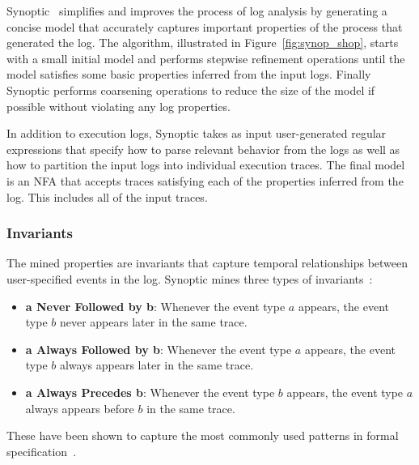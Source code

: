 \footnotetext[\value{footnote}]{The user with IP address 13.15.232.201 reduces 
   the shopping cart price despite applying an invalid coupon.}

Synoptic~\cite{BeschastnikhBSSE2011} simplifies and improves the process of log
analysis 
by generating a concise model that accurately captures important properties of the
process that generated the log. The algorithm, illustrated in
Figure~\ref{fig:synop_shop}, starts with a small initial model and
performs stepwise refinement operations until the model satisfies some basic
properties inferred from the input logs. Finally Synoptic performs coarsening
operations to reduce the size of the model if possible without violating any log
properties.

In addition to execution logs, Synoptic takes as
input user-generated regular expressions that specify how to parse relevant 
behavior from the logs
as well as how to partition the input logs into individual
execution traces. The final model is an NFA that accepts
traces satisfying each of the properties inferred from the log. This includes
all of the input traces.

\subsubsection{Invariants}
The mined properties are invariants that capture temporal relationships
between user-specified events in the log. Synoptic mines three types of
invariants~\cite{BeschastnikhBSSE2011}:

\begin{itemize}
\item \textbf{a Never Followed by b}: Whenever the event
type $a$ appears, the event type $b$ never appears later in the same trace.

\item \textbf{a Always Followed by b}: Whenever the event
type $a$ appears, the event type $b$ always appears later in the same trace.

\item \textbf{a Always Precedes b}: Whenever the event
type $b$ appears, the event type $a$ always appears before $b$ in the same
trace.
\end{itemize}

These have been shown to capture the most commonly used patterns in formal
specification~\cite{dwyer_spec_patterns_1999}.

